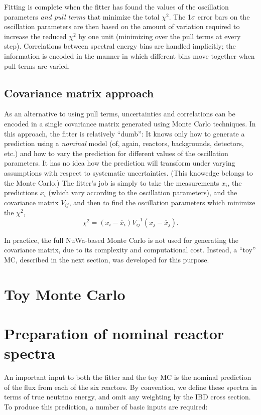 \documentclass[../thesis.tex]{subfiles}
\begin{document}
Fitting is complete when the fitter has found the values of the oscillation parameters \emph{and pull terms} that minimize the total $\chi^2$. The 1$\sigma$ error bars on the oscillation parameters are then based on the amount of variation required to increase the reduced $\chi^2$ by one unit (minimizing over the pull terms at every step). Correlations between spectral energy bins are handled implicitly; the information is encoded in the manner in which different bins move together when pull terms are varied.

\subsection{Covariance matrix approach}
\label{sec:covmatapproach}

As an alternative to using pull terms, uncertainties and correlations can be encoded in a single covariance matrix generated using Monte Carlo techniques. In this approach, the fitter is relatively ``dumb'': It knows only how to generate a prediction using a \emph{nominal} model (of, again, reactors, backgrounds, detectors, etc.) and how to vary the prediction for different values of the oscillation parameters. It has no idea how the prediction will transform under varying assumptions with respect to systematic uncertainties. (This knowedge belongs to the Monte Carlo.) The fitter's job is simply to take the measurements $x_i$, the predictions $\overline x_i$ (which vary according to the oscillation parameters), and the covariance matrix $V_{ij}$, and then to find the oscillation parameters which minimize the $\chi^2$,
\[ \chi^2 = (x_i - \overline x_i) V_{ij}^{-1} (x_j - \overline x_j). \]

In practice, the full NuWa-based Monte Carlo is not used for generating the covariance matrix, due to its complexity and computational cost. Instead, a ``toy'' MC, described in the next section, was developed for this purpose. 

\section{Toy Monte Carlo}
\label{sec:toymc}

\section{Preparation of nominal reactor spectra}
\label{sec:nomspecprep}

An important input to both the fitter and the toy MC is the nominal prediction of the flux from each of the six reactors. By convention, we define these spectra in terms of true neutrino energy, and omit any weighting by the IBD cross section.
To produce this prediction, a number of basic inputs are required:
\end{document}
